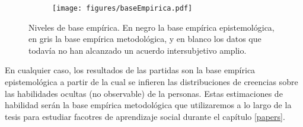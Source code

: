 \documentclass[a4paper,10pt]{book}
\theoremstyle{definition}
\begin{document}
\begin{figure}[ht!]
    \centering
    \begin{subfigure}[b]{0.48\textwidth}
    \texttt{[image: figures/baseEmpirica.pdf]}
    \end{subfigure}
    \caption{Niveles de base emp\'irica. En negro la base emp\'irica epistemol\'ogica, en gris la base emp\'irica metodol\'ogica, y en blanco los datos que todav\'ia no han alcanzado un acuerdo intersubjetivo amplio. }
\end{figure}
%
En cualquier caso, los resultados de las partidas son la base emp\'irica epistemol\'ogica a partir de la cual se infieren las distribuciones de creencias sobre las habilidades ocultas (no observable) de la personas.
%
Estas estimaciones de habilidad ser\'an la base emp\'irica metodol\'ogica que utilizaremos a lo largo de la tesis para estudiar facotres de aprendizaje social durante el capítulo \ref{papers}.
\end{document}
